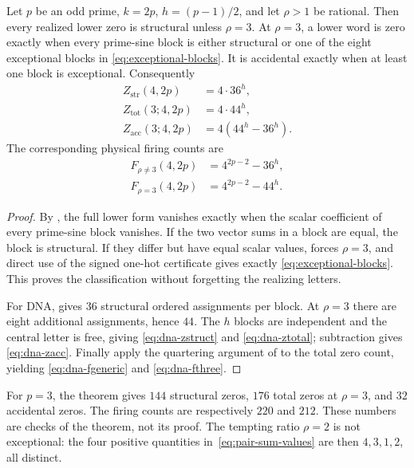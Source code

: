 \begin{theorem}
\label{thm:rational-twice-prime}
Let $p$ be an odd prime, $k=2p$, $h=(p-1)/2$, and let $\rho>1$ be rational.
Then every realized lower zero is structural unless $\rho=3$.  At
$\rho=3$, a lower word is zero exactly when every prime-sine block is either
structural or one of the eight exceptional blocks in
\eqref{eq:exceptional-blocks}.  It is accidental exactly when at least one
block is exceptional.  Consequently
\begin{align}
  Z_{\mathrm{str}}(4,2p)&=4\cdot36^h,                                    \label{eq:dna-zstruct}\\
  Z_{\mathrm{tot}}(3;4,2p)&=4\cdot44^h,                                  \label{eq:dna-ztotal}\\
  Z_{\mathrm{acc}}(3;4,2p)&=4(44^h-36^h).                                \label{eq:dna-zacc}
\end{align}
The corresponding physical firing counts are
\begin{align}
  F_{\rho\ne3}(4,2p)&=4^{2p-2}-36^h,                                    \label{eq:dna-fgeneric}\\
  F_{\rho=3}(4,2p)&=4^{2p-2}-44^h.                                      \label{eq:dna-fthree}
\end{align}
\end{theorem}

\begin{proof}
By , the full lower form vanishes exactly when the
scalar coefficient of every prime-sine block vanishes.  If the two vector
sums in a block are equal, the block is structural.  If they differ but have
equal scalar values,  forces $\rho=3$, and direct use of
the signed one-hot certificate gives exactly
\eqref{eq:exceptional-blocks}.  This proves the classification without
forgetting the realizing letters.

For DNA,  gives $36$ structural ordered assignments
per block.  At $\rho=3$ there are eight additional assignments, hence $44$.
The $h$ blocks are independent and the central letter is free, giving
\eqref{eq:dna-zstruct} and \eqref{eq:dna-ztotal}; subtraction gives
\eqref{eq:dna-zacc}.  Finally apply the quartering argument of
 to the total zero count, yielding
\eqref{eq:dna-fgeneric} and \eqref{eq:dna-fthree}.
\end{proof}

For $p=3$, the theorem gives $144$ structural zeros, $176$ total zeros at
$\rho=3$, and $32$ accidental zeros.  The firing counts are respectively
$220$ and $212$.  These numbers are checks of the theorem, not its proof.
The tempting ratio $\rho=2$ is not exceptional: the four positive quantities
in~\eqref{eq:pair-sum-values} are then $4,3,1,2$, all distinct.

